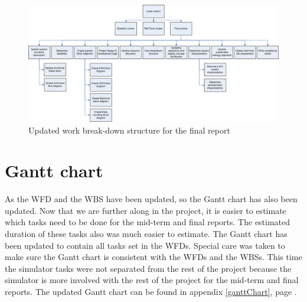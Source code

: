 \begin{figure}
\centering
\includegraphics[width=\textheight, angle=90]{chapters/img/Workbreakdown_structure_FR_v2.png}
\caption{Updated work break-down structure for the final report}
\label{fig:WFfinal2}
\end{figure}

\section{Gantt chart}
\label{Gantt}
As the \ac{WFD} and the \ac{WBS} have been updated, so the Gantt chart has also been updated. 
Now that we are further along in the project, it is easier to estimate which tasks need to be done for the mid-term and final reports. The estimated duration of these tasks also was much easier to estimate. The Gantt chart has been updated to contain all tasks set in the \ac{WFD}s. Special care was taken to make sure the Gantt chart is consistent with the \ac{WFD}s and the \ac{WBS}s.
This time the simulator tasks were not separated from the rest of the project because the simulator is more involved with the 
rest of the project for the mid-term and final reports.
The updated Gantt chart can be found in appendix \ref{ganttChart}, page \pageref{ganttChart}.